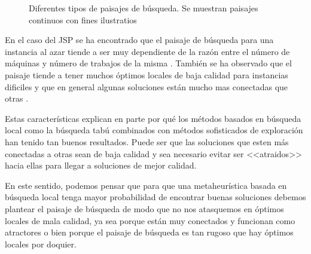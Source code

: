 \begin{figure}[H]
    \caption{Diferentes tipos de paisajes de búsqueda. Se muestran paisajes continuos con fines ilustratios}
\end{figure}

En el caso del JSP se ha encontrado que el paisaje de búsqueda para una instancia al azar tiende a ser muy dependiente de la razón entre el número de máquinas y número de trabajos de la misma \cite{Streeter2006}. También se ha observado que el paisaje tiende a tener muchos óptimos locales de baja calidad para instancias dificiles \cite{mattfeld1999search} y que en general algunas soluciones están mucho mas conectadas que otras \cite{bierwirth2004landscape}. 

Estas características explican en parte por qué los métodos basados en búsqueda local como la búsqueda tabú combinados con métodos sofisticados de exploración han tenido tan buenos resultados. Puede ser que las soluciones que esten más conectadas a otras sean de baja calidad y sea necesario evitar ser <<atraidos>> hacia ellas para llegar a soluciones de mejor calidad.

En este sentido, podemos pensar que para que una metaheurística basada en búsqueda local tenga mayor probabilidad de encontrar buenas soluciones debemos plantear el paisaje de búsqueda de modo que no nos atasquemos en óptimos locales de mala calidad, ya sea porque están muy conectados y funcionan como atractores o bien porque el paisaje de búsqueda es tan rugoso que hay óptimos locales por doquier.
